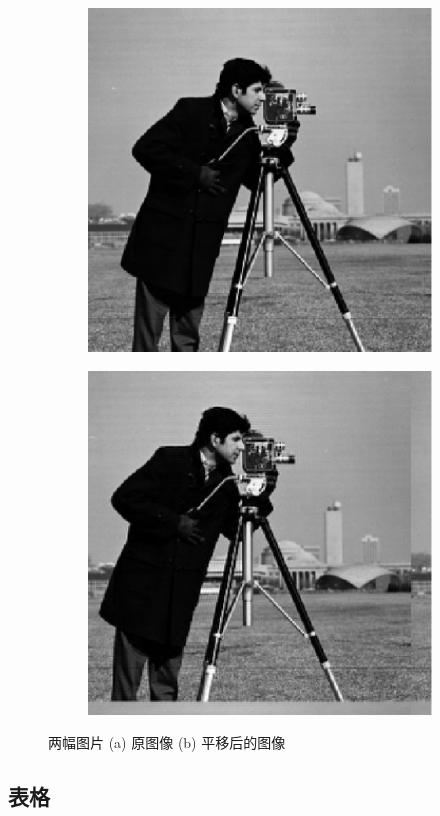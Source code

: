 \begin{figure}[htb!]
    \centering
    \begin{subfigure}{.3\textwidth}
        \centering
        \includegraphics[width=\textwidth]{./img/im1.pdf}
        \caption{}
        \label{fig:cameraman2_1}
    \end{subfigure}
    \begin{subfigure}{.3\textwidth}
        \centering
        \includegraphics[width=\textwidth]{./img/im2.pdf}
        \caption{}
        \label{fig:cameraman2_2}
    \end{subfigure}
    \caption{两幅图片 (a) 原图像 (b) 平移后的图像}
    \label{fig:cameraman2}
\end{figure}

\subsection{表格}
